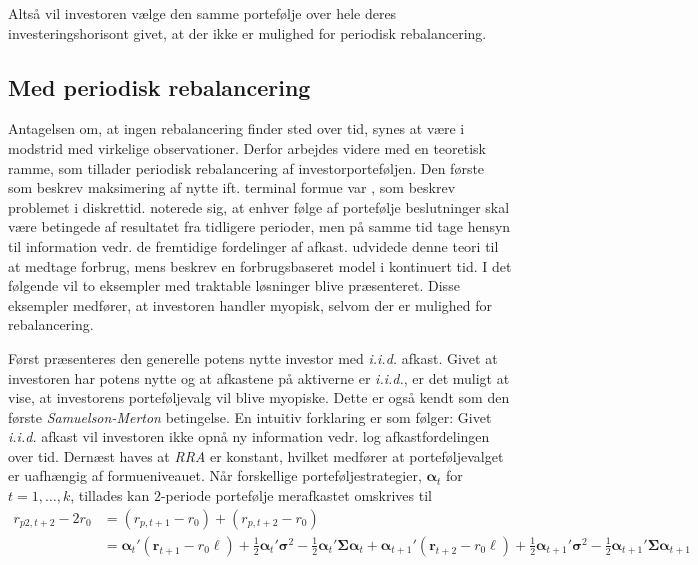 \documentclass[
  a4paper,
  oneside]{memoir}
\begin{document}
Altså vil investoren vælge den samme portefølje over hele deres investeringshorisont givet, at der ikke er mulighed for periodisk rebalancering.

\hypertarget{medperireb}{%
\subsection{Med periodisk rebalancering}\label{medperireb}}

Antagelsen om, at ingen rebalancering finder sted over tid, synes at være i modstrid med virkelige observationer. Derfor arbejdes videre med en teoretisk ramme, som tillader periodisk rebalancering af investorporteføljen. Den første som beskrev maksimering af nytte ift. terminal formue var \citep{Mossin1968}, som beskrev problemet i diskrettid. \citep{Mossin1968} noterede sig, at enhver følge af portefølje beslutninger skal være betingede af resultatet fra tidligere perioder, men på samme tid tage hensyn til information vedr. de fremtidige fordelinger af afkast. \citep{Samuelson1969} udvidede denne teori til at medtage forbrug, mens \citep{Merton1969, Merton1971} beskrev en forbrugsbaseret model i kontinuert tid. I det følgende vil to eksempler med traktable løsninger blive præsenteret. Disse eksempler medfører, at investoren handler myopisk, selvom der er mulighed for rebalancering.

Først præsenteres den generelle potens nytte investor med \emph{i.i.d.} afkast. Givet at investoren har potens nytte og at afkastene på aktiverne er \emph{i.i.d.}, er det muligt at vise, at investorens porteføljevalg vil blive myopiske. Dette er også kendt som den første \emph{Samuelson-Merton} betingelse. En intuitiv forklaring er som følger: Givet \emph{i.i.d.} afkast vil investoren ikke opnå ny information vedr. log afkastfordelingen over tid. Dernæst haves at \emph{RRA} er konstant, hvilket medfører at porteføljevalget er uafhængig af formueniveauet. Når forskellige porteføljestrategier, \(\bm{\alpha}_t\) for \(t=1,\dots,k\), tillades kan \(2\)-periode portefølje merafkastet omskrives til
\begin{align*}
r_{p2,t+2}-2r_0&=(r_{p,t+1}-r_0)+(r_{p,t+2}-r_0)\\
&= \bm{\alpha}_t'(\bm{r}_{t+1}-r_0\bm{\ell})+\frac{1}{2}\bm{\alpha}_t'\bm{\sigma}^2-\frac{1}{2} \bm{\alpha}_t'\bm{\Sigma}\bm{\alpha}_t + \bm{\alpha}_{t+1}'(\bm{r}_{t+2}-r_0\bm{\ell})+\frac{1}{2}\bm{\alpha}_{t+1}'\bm{\sigma}^2-\frac{1}{2} \bm{\alpha}_{t+1}'\bm{\Sigma}\bm{\alpha}_{t+1}
\end{align*}
\end{document}
